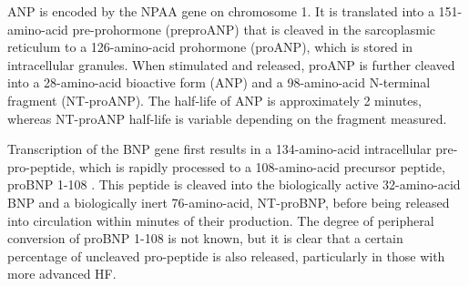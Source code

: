 \documentclass[14pt,a4paper,onecolumn]{extarticle}
\begin{document}
ANP is encoded by the NPAA gene on chromosome 1. It is translated into a 151-amino-acid pre-prohormone (preproANP) that is cleaved in the sarcoplasmic reticulum to a 126-amino-acid prohormone (proANP), which is stored in intracellular granules.  When stimulated and released, proANP is further cleaved into a 28-amino-acid bioactive form (ANP) and a 98-amino-acid N-terminal fragment (NT-proANP). The half-life of ANP is approximately 2 minutes, whereas NT-proANP half-life is variable depending on the fragment measured. \citep{Volpe2016} %




Transcription of the BNP gene first results in a 134-amino-acid intracellular pre-pro-peptide, which is rapidly processed to a 108-amino-acid precursor peptide, proBNP 1-108 . This peptide is cleaved into the biologically active 32-amino-acid BNP and a biologically inert 76-amino-acid, NT-proBNP, before being released into circulation within minutes of their production. The degree of peripheral conversion of proBNP 1-108 is not known, but it is clear that a certain percentage of uncleaved pro-peptide is also released, particularly in those with more advanced HF. \citep{Gaggin2014} %
\end{document}

